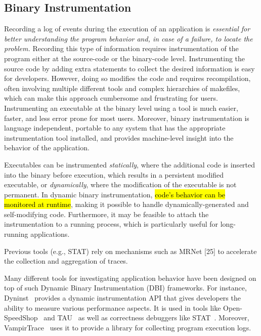 \subsection{Binary Instrumentation}
Recording a log of events during the execution of an application is \textit{essential for better understanding the program behavior and, in case of a failure, to locate the problem.} Recording this type of information requires instrumentation of the program either at the source-code or the binary-code level. Instrumenting the source code by adding extra statements to collect the desired information is easy for developers. However, doing so modifies the code and requires recompilation, often involving multiple different tools and complex hierarchies of makefiles, which can make this approach cumbersome and frustrating for users. Instrumenting an executable at the binary level using a tool is much easier, faster, and less error prone for most users. Moreover, binary instrumentation is language independent, portable to any system that has the appropriate instrumentation tool installed, and provides machine-level insight into the behavior of the application.

Executables can be instrumented \textit{statically}, where the additional code is inserted into the binary before execution, which results in a persistent modified executable, or \textit{dynamically}, where the modification of the executable is not permanent. In dynamic binary instrumentation, \hl{code's behavior can be monitored at runtime}, making it possible to handle dynamically-generated and self-modifying code. Furthermore, it may be feasible to attach the instrumentation to a running process, which is particularly useful for long-running applications.


Previous tools (e.g., STAT) rely on mechanisms such as MRNet [25]
to accelerate the collection and aggregation of traces.



Many different tools for investigating application behavior have been designed on top of such Dynamic Binary Instrumentation (DBI) frameworks. For instance, Dyninst~\cite{dyninst} provides a dynamic instrumentation API that gives developers the ability to measure various performance aspects. It is used in tools like Open-SpeedShop~\cite{openss} and TAU~\cite{tau} as well as correctness debuggers like STAT~\cite{stat}. Moreover, VampirTrace~\cite{vampirt} uses it to provide a library for collecting program execution logs. 

